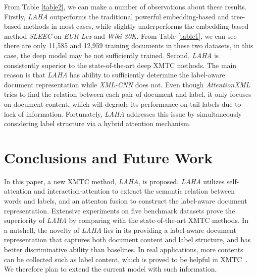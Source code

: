 \documentclass[runningheads]{llncs}
\begin{document}
From Table \ref{table2}, we can make a number of observations about these results. Firstly, \textit{LAHA} outperforms the traditional powerful embedding-based and tree-based methods in most cases, while slightly underperforms the embedding-based method \textit{SLEEC} on \textit{EUR-Lex} and \textit{Wiki-30K}. From Table \ref{table1}, we can see there are only 11,585 and 12,959 training documents in these two datasets, in this case, the deep model may be not sufficiently trained.
Second, \textit{LAHA} is consistently superior to the state-of-the-art deep XMTC methods. The main reason is that \textit{LAHA} has ability to sufficiently determine the label-aware document representation while \textit{XML-CNN} does not. Even though \textit{AttentionXML} tries to find the relation between each pair of document and label, it only focuses on document content, which will degrade its performance on tail labels due to lack of information. Fortunately, \textit{LAHA} addresses this issue by simultaneously considering label structure via a hybrid attention mechanism. 






\vspace{-4mm}
\section{Conclusions and Future Work}
In this paper, a new XMTC method, \textit{LAHA}, is proposed. \textit{LAHA} utilizes self-attention and interaction-attention to extract the semantic relation between words and labels, and an attenton fusion to construct the label-aware document representation. Extensive experiments on five benchmark datasets prove the superiority of \textit{LAHA} by comparing with the state-of-the-art XMTC methods.
In a nutshell, the novelty of \textit{LAHA} lies in its providing a label-aware document representation that captures both document content and label structure, and has better discriminative ability than baselines.
In real applications, more contents can be collected such as label content, which is proved to be helpful in XMTC~\cite{ref_article8}. We therefore plan to extend the current model with such information. 
\end{document}
